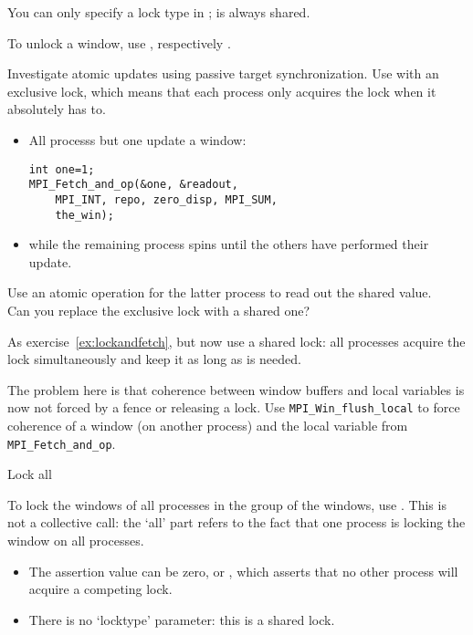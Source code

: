 You can only specify a lock type in ;
 is always shared.

To unlock a window, use
, %
respectively .

\begin{exercise}
  \label{ex:lockandfetch}
  Investigate atomic updates using passive target synchronization.
  Use  with an exclusive lock, which
  means that each process only acquires the lock when it absolutely has to.
  \begin{itemize}
  \item All processs but one update a window:
\begin{lstlisting}
int one=1;
MPI_Fetch_and_op(&one, &readout,
    MPI_INT, repo, zero_disp, MPI_SUM,
    the_win);
\end{lstlisting}
  \item while the remaining process spins until the others have performed their update.
  \end{itemize}
  Use an atomic operation for the latter process to read out the shared value.\\
  Can you replace the exclusive lock with a shared one?
\end{exercise}

\begin{exercise}
  \label{ex:lockfetchshared}
  As exercise~\ref{ex:lockandfetch}, but now use a shared lock:
  all processes acquire the lock simultaneously and keep it as long as is needed.

  The problem here is that coherence between window buffers and local variables is
  now not forced by a fence or releasing a lock. Use \lstinline{MPI_Win_flush_local} to
  force coherence of a window (on another process) and the local variable from
  \lstinline{MPI_Fetch_and_op}.
\end{exercise}

 {Lock all}
\label{sec:win-lock-all}

To lock the windows of all processes in the group of the windows, use
. This is not a collective call:
the `all' part refers to the fact that one process is locking the
window on all processes.
\begin{itemize}
\item
  The assertion value can be zero, or ,
  which asserts that no other process will acquire a competing lock.
\item There is no `locktype' parameter: this is a shared lock.
\end{itemize}

